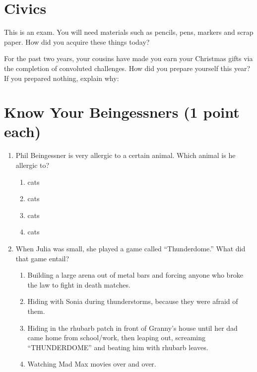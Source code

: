 \documentclass[11pt]{exam}
\begin{document}
\begin{questions}




\newpage
\section{Civics}
\addpoints

\question[2] This is an exam. You will need materials such as pencils, pens,
markers and scrap paper. How did you acquire these things today?
\vfill

\question[3] For the past two years, your cousins have made you earn your
Christmas gifts via the completion of convoluted challenges. How did you prepare
yourself this year? If you prepared nothing, explain why:
\vfill





\newpage
\section{Know Your Beingessners (1 point each)}

\begin{enumerate}
\item Phil Beingessner is very allergic to a certain animal. Which animal is he allergic to?

\begin{enumerate}
\item cats
\item cats
\item cats
\item cats
\end{enumerate}



\item When Julia was small, she played a game called ``Thunderdome.'' What did that game entail?

\begin{enumerate}
\item Building a large arena out of metal bars and forcing anyone who broke the law to fight
in death matches.
\item Hiding with Sonia during thunderstorms, because they were afraid of them.
\item Hiding in the rhubarb patch in front of Granny’s house until her dad came home from
school/work, then leaping out, screaming ``THUNDERDOME'' and beating him with
rhubarb leaves.
\item Watching Mad Max movies over and over.
\end{enumerate}




\end{enumerate}
\end{questions}
\end{document}
